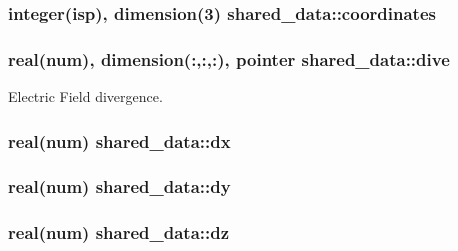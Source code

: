 \subsubsection[{\texorpdfstring{coordinates}{coordinates}}]{\setlength{\rightskip}{0pt plus 5cm}integer(isp), dimension(3) shared\+\_\+data\+::coordinates}\hypertarget{namespaceshared__data_afafd7a6c030e4a324d60bdaf80cdf1fc}{}\label{namespaceshared__data_afafd7a6c030e4a324d60bdaf80cdf1fc}
\subsubsection[{\texorpdfstring{dive}{dive}}]{\setlength{\rightskip}{0pt plus 5cm}real(num), dimension(\+:,\+:,\+:), pointer shared\+\_\+data\+::dive}\hypertarget{namespaceshared__data_a548e3c8fc335921c106eada05587df31}{}\label{namespaceshared__data_a548e3c8fc335921c106eada05587df31}


Electric Field divergence. 

\subsubsection[{\texorpdfstring{dx}{dx}}]{\setlength{\rightskip}{0pt plus 5cm}real(num) shared\+\_\+data\+::dx}\hypertarget{namespaceshared__data_a0d718dcaae94920d7faaa4aa47011d5b}{}\label{namespaceshared__data_a0d718dcaae94920d7faaa4aa47011d5b}
\subsubsection[{\texorpdfstring{dy}{dy}}]{\setlength{\rightskip}{0pt plus 5cm}real(num) shared\+\_\+data\+::dy}\hypertarget{namespaceshared__data_a6531be1297bb2ed26fdf8e7336d85e38}{}\label{namespaceshared__data_a6531be1297bb2ed26fdf8e7336d85e38}
\subsubsection[{\texorpdfstring{dz}{dz}}]{\setlength{\rightskip}{0pt plus 5cm}real(num) shared\+\_\+data\+::dz}\hypertarget{namespaceshared__data_a2fb63621d7a6ce9df1700fe5cca75d01}{}\label{namespaceshared__data_a2fb63621d7a6ce9df1700fe5cca75d01}
